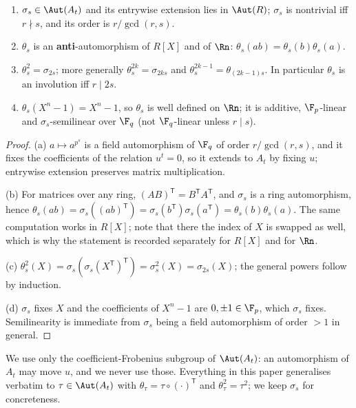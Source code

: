 \begin{lemma}\label{lem:theta}
\begin{enumerate}[label=\textnormal{(\alph*)},leftmargin=*]
\item $\sigma_s\in\Aut(A_t)$ and its entrywise extension lies in $\Aut(R)$;
  $\sigma_s$ is nontrivial iff $r\nmid s$, and its order is $r/\gcd(r,s)$.
\item $\theta_s$ is an \textbf{anti}-automorphism of $R[X]$ and of $\Rn$:
  $\theta_s(ab)=\theta_s(b)\theta_s(a)$.
\item $\theta_s^2=\sigma_{2s}$; more generally $\theta_s^{2k}=\sigma_{2ks}$ and
  $\theta_s^{2k-1}=\theta_{(2k-1)s}$. In particular $\theta_s$ is an involution
  iff $r\mid 2s$.
\item $\theta_s(X^n-1)=X^n-1$, so $\theta_s$ is well defined on $\Rn$; it is
  additive, $\F_p$-linear and $\sigma_s$-semilinear over $\F_q$ (not
  $\F_q$-linear unless $r\mid s$).
\end{enumerate}
\end{lemma}

\begin{proof}
(a) $a\mapsto a^{p^s}$ is a field automorphism of $\F_q$ of order
$r/\gcd(r,s)$, and it fixes the coefficients of the relation $u^t=0$, so it
extends to $A_t$ by fixing $u$; entrywise extension preserves matrix
multiplication.

(b) For matrices over any ring, $(AB)^{\mathsf T}=B^{\mathsf T}A^{\mathsf T}$,
and $\sigma_s$ is a ring automorphism, hence
$\theta_s(ab)=\sigma_s((ab)^{\mathsf T})
=\sigma_s(b^{\mathsf T})\sigma_s(a^{\mathsf T})=\theta_s(b)\theta_s(a)$. The
same computation works in $R[X]$; note that there the index of $X$ is swapped
as well, which is why the statement is recorded separately for $R[X]$ and for
$\Rn$.

(c) $\theta_s^2(X)=\sigma_s(\sigma_s(X^{\mathsf T})^{\mathsf T})=\sigma_s^2(X)
=\sigma_{2s}(X)$; the general powers follow by induction.

(d) $\sigma_s$ fixes $X$ and the coefficients of $X^n-1$ are $0,\pm1\in\F_p$,
which $\sigma_s$ fixes. Semilinearity is immediate from $\sigma_s$ being a field
automorphism of order $>1$ in general.
\end{proof}

\begin{remark}
We use only the coefficient-Frobenius subgroup of $\Aut(A_t)$: an automorphism
of $A_t$ may move $u$, and we never use those. Everything in this paper
generalises verbatim to $\tau\in\Aut(A_t)$ with $\theta_\tau=\tau\circ(\cdot)^{\mathsf T}$
and $\theta_\tau^2=\tau^2$; we keep $\sigma_s$ for concreteness.
\end{remark}

